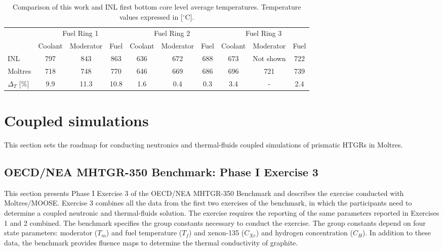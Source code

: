 \begin{table}[htbp!]
\centering
      \caption{Comparison of this work and INL \cite{strydom_inl_2013} first bottom core level average temperatures. Temperature values expressed in [$^{\circ}$C].}
      \label{tab:th-ex2a-results}
  \begin{tabular}{l|ccc|ccc|ccc}
    \toprule
          & \multicolumn{3}{c|}{Fuel Ring 1} & \multicolumn{3}{c|}{Fuel Ring 2} & \multicolumn{3}{c}{Fuel Ring 3} \\ %
          & Coolant & Moderator & Fuel & Coolant & Moderator & Fuel & Coolant & Moderator & Fuel \\
    \midrule
INL          & 797  & 843  & 863  & 636  & 672  & 688  & 673  & Not shown  & 722  \\
Moltres      & 718  & 748  & 770  & 646  & 669  & 686  & 696  & 721        & 739  \\
$\Delta_T$ [\%]     & 9.9  & 11.3 & 10.8 & 1.6  & 0.4  & 0.3  & 3.4  & -  & 2.4  \\
    \bottomrule
  \end{tabular}
\end{table}

\section{Coupled simulations}
\label{sec:thermal-coupling}

This section sets the roadmap for conducting neutronics and thermal-fluids coupled simulations of prismatic HTGRs in Moltres.

\subsection{OECD/NEA MHTGR-350 Benchmark: Phase I Exercise 3}
\label{sec:ph1ex3}

This section presents Phase I Exercise 3 of the OECD/NEA MHTGR-350 Benchmark and describes the exercise conducted with Moltres/MOOSE.
Exercise 3 combines all the data from the first two exercises of the benchmark, in which the participants need to determine a coupled neutronic and thermal-fluids solution.
The exercise requires the reporting of the same parameters reported in Exercises 1 and 2 combined.
The benchmark specifies the group constants necessary to conduct the exercise.
The group constants depend on four state parameters: moderator ($T_m$) and fuel temperature ($T_f$) and xenon-135 ($C_{Xe}$) and hydrogen concentration ($C_H$).
In addition to these data, the benchmark provides fluence maps to determine the thermal conductivity of graphite.


